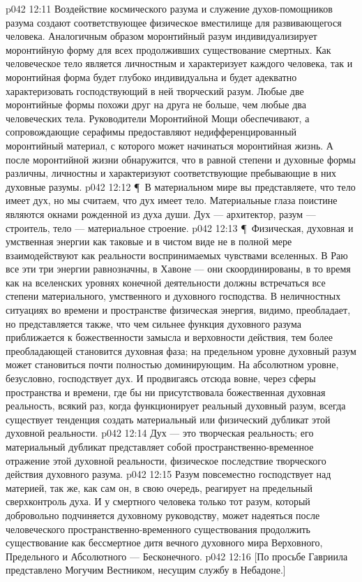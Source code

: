 \vs p042 12:11 Воздействие космического разума и служение духов\hyp{}помощников разума создают соответствующее физическое вместилище для развивающегося человека. Аналогичным образом моронтийный разум индивидуализирует моронтийную форму для всех продолживших существование смертных. Как человеческое тело является личностным и характеризует каждого человека, так и моронтийная форма будет глубоко индивидуальна и будет адекватно характеризовать господствующий в ней творческий разум. Любые две моронтийные формы похожи друг на друга не больше, чем любые два человеческих тела. Руководители Моронтийной Мощи обеспечивают, а сопровождающие серафимы предоставляют недифференцированный моронтийный материал, с которого может начинаться моронтийная жизнь. А после моронтийной жизни обнаружится, что в равной степени и духовные формы различны, личностны и характеризуют соответствующие пребывающие в них духовные разумы.
\vs p042 12:12 \P\ В материальном мире вы представляете, что тело имеет дух, но мы считаем, что дух имеет тело. Материальные глаза поистине являются окнами рожденной из духа души. Дух --- архитектор, разум --- строитель, тело --- материальное строение.
\vs p042 12:13 \P\ Физическая, духовная и умственная энергии как таковые и в чистом виде не в полной мере взаимодействуют как реальности воспринимаемых чувствами вселенных. В Раю все эти три энергии равнозначны, в Хавоне --- они скоординированы, в то время как на вселенских уровнях конечной деятельности должны встречаться все степени материального, умственного и духовного господства. В неличностных ситуациях во времени и пространстве физическая энергия, видимо, преобладает, но представляется также, что чем сильнее функция духовного разума приближается к божественности замысла и верховности действия, тем более преобладающей становится духовная фаза; на предельном уровне духовный разум может становиться почти полностью доминирующим. На абсолютном уровне, безусловно, господствует дух. И продвигаясь отсюда вовне, через сферы пространства и времени, где бы ни присутствовала божественная духовная реальность, всякий раз, когда функционирует реальный духовный разум, всегда существует тенденция создать материальный или физический дубликат этой духовной реальности.
\vs p042 12:14 Дух --- это творческая реальность; его материальный дубликат представляет собой пространственно\hyp{}временное отражение этой духовной реальности, физическое последствие творческого действия духовного разума.
\vs p042 12:15 Разум повсеместно господствует над материей, так же, как сам он, в свою очередь, реагирует на предельный сверхконтроль духа. И у смертного человека только тот разум, который добровольно подчиняется духовному руководству, может надеяться после человеческого пространственно\hyp{}временного существования продолжить существование как бессмертное дитя вечного духовного мира Верховного, Предельного и Абсолютного --- Бесконечного.
\vs p042 12:16 [По просьбе Гавриила представлено Могучим Вестником, несущим службу в Небадоне.]
